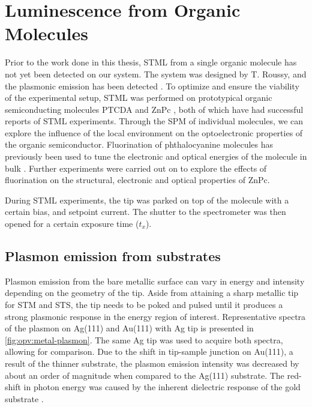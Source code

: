
\chapter{Luminescence from Organic Molecules}
\label{ch:opv}

Prior to the work done in this thesis, \ac{STML} from a single organic molecule has not yet been detected on our system. The system was designed by T. Roussy, and the plasmonic emission has been detected \citep{roussy2016coupling}. To optimize and ensure the viability of the experimental setup, \ac{STML} was performed on prototypical organic semiconducting molecules \ac{PTCDA} \citep{Rzeznicka2011, Kimura2019} and \ac{ZnPc} \citep{Zhang2016, Doppagne2017, Zhang2017, Imada2016, Doppagne2018, Miwa2019}, both of which have had successful reports of \ac{STML} experiments. Through the \ac{SPM} of individual molecules, we can explore the influence of the local environment on the optoelectronic properties of the organic semiconductor. Fluorination of phthalocyanine molecules has previously been used to tune the electronic and optical energies of the molecule in bulk \citep{schwarze2016band, warren2019controlling}. Further experiments were carried out on  to explore the effects of fluorination on the structural, electronic and optical properties of ZnPc. 

During \ac{STML} experiments, the tip was parked on top of the molecule with a certain bias, and setpoint current. The shutter to the spectrometer was then opened for a certain exposure time ($t_x$).

\section{Plasmon emission from substrates}

Plasmon emission from the bare metallic surface can vary in energy and intensity depending on the geometry of the tip. Aside from attaining a sharp metallic tip for \ac{STM} and \ac{STS}, the tip needs to be poked and pulsed until it produces a strong plasmonic response in the energy region of interest. Representative spectra of the plasmon on Ag(111) and Au(111) with Ag tip is presented in \autoref{fig:opv:metal-plasmon}. The same Ag tip was used to acquire both spectra, allowing for comparison. Due to the shift in tip-sample junction on Au(111), a result of the thinner substrate, the plasmon emission intensity was decreased by about an order of magnitude when compared to the Ag(111) substrate. The red-shift in photon energy was caused by the inherent dielectric response of the gold substrate \citep{olmon2012optical, yang2015optical}. 

